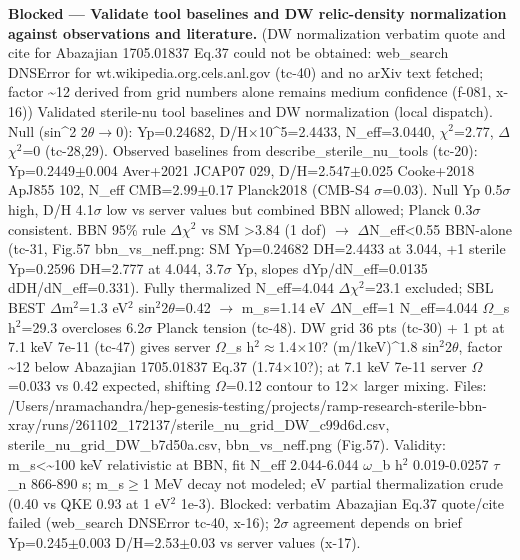\documentclass[11pt,a4paper]{article}
\begin{document}
\textbf{Blocked --- Validate tool baselines and DW relic-density normalization against observations and literature.} (DW normalization verbatim quote and cite for Abazajian 1705.01837 Eq.37 could not be obtained: web\_search DNSError for wt.wikipedia.org.cels.anl.gov (tc-40) and no arXiv text fetched; factor \textasciitilde{}12 derived from grid numbers alone remains medium confidence (f-081, x-16)) Validated sterile-nu tool baselines and DW normalization (local dispatch). Null (sin\textasciicircum{}2 2$\theta$$\to$0): Yp=0.24682, D/H$\times$10\textasciicircum{}5=2.4433, N\_eff=3.0440, $\chi$$^2$=2.77, $\Delta$$\chi$$^2$=0 (tc-28,29). Observed baselines from describe\_sterile\_nu\_tools (tc-20): Yp=0.2449$\pm$0.004 Aver+2021 JCAP07 029, D/H=2.547$\pm$0.025 Cooke+2018 ApJ855 102, N\_eff CMB=2.99$\pm$0.17 Planck2018 (CMB-S4 $\sigma$=0.03). Null Yp 0.5$\sigma$ high, D/H 4.1$\sigma$ low vs server values but combined BBN allowed; Planck 0.3$\sigma$ consistent. BBN 95\% rule $\Delta$$\chi$$^2$ vs SM \textgreater{}3.84 (1 dof) $\to$ $\Delta$N\_eff\textless{}0.55 BBN-alone (tc-31, Fig.57 bbn\_vs\_neff.png: SM Yp=0.24682 DH=2.4433 at 3.044, +1 sterile Yp=0.2596 DH=2.777 at 4.044, 3.7$\sigma$ Yp, slopes dYp/dN\_eff=0.0135 dDH/dN\_eff=0.331). Fully thermalized N\_eff=4.044 $\Delta$$\chi$$^2$=23.1 excluded; SBL BEST $\Delta$m$^2$=1.3 eV$^2$ sin$^2$2$\theta$=0.42 $\to$ m\_s=1.14 eV $\Delta$N\_eff=1 N\_eff=4.044 $\Omega$\_s h$^2$=29.3 overcloses 6.2$\sigma$ Planck tension (tc-48). DW grid 36 pts (tc-30) + 1 pt at 7.1 keV 7e-11 (tc-47) gives server $\Omega$\_s h$^2$$\approx$1.4$\times$10? (m/1keV)\textasciicircum{}1.8 sin$^2$2$\theta$, factor \textasciitilde{}12 below Abazajian 1705.01837 Eq.37 (1.74$\times$10?); at 7.1 keV 7e-11 server $\Omega$=0.033 vs 0.42 expected, shifting $\Omega$=0.12 contour to 12$\times$ larger mixing. Files: /Users/nramachandra/hep-genesis-testing/projects/ramp-research-sterile-bbn-xray/runs/261102\_172137/sterile\_nu\_grid\_DW\_c99d6d.csv, sterile\_nu\_grid\_DW\_b7d50a.csv, bbn\_vs\_neff.png (Fig.57). Validity: m\_s\textless{}\textasciitilde{}100 keV relativistic at BBN, fit N\_eff 2.044-6.044 $\omega$\_b h$^2$ 0.019-0.0257 $\tau$\_n 866-890 s; m\_s$\geq$1 MeV decay not modeled; eV partial thermalization crude (0.40 vs QKE 0.93 at 1 eV$^2$ 1e-3). Blocked: verbatim Abazajian Eq.37 quote/cite failed (web\_search DNSError tc-40, x-16); 2$\sigma$ agreement depends on brief Yp=0.245$\pm$0.003 D/H=2.53$\pm$0.03 vs server values (x-17).
\end{document}
